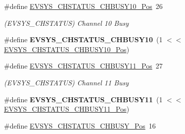 \begin{DoxyCompactItemize}
\item 
\hypertarget{group___s_a_m_l21___e_v_s_y_s_gaef16f98ea1ecf706c13aaab54a8f89ee}{}\#define \hyperlink{group___s_a_m_l21___e_v_s_y_s_gaef16f98ea1ecf706c13aaab54a8f89ee}{E\+V\+S\+Y\+S\+\_\+\+C\+H\+S\+T\+A\+T\+U\+S\+\_\+\+C\+H\+B\+U\+S\+Y10\+\_\+\+Pos}~26\label{group___s_a_m_l21___e_v_s_y_s_gaef16f98ea1ecf706c13aaab54a8f89ee}

\begin{DoxyCompactList}\small\item\em (E\+V\+S\+Y\+S\+\_\+\+C\+H\+S\+T\+A\+T\+U\+S) Channel 10 Busy \end{DoxyCompactList}\item 
\hypertarget{group___s_a_m_l21___e_v_s_y_s_ga1d8c6c70bd3bb364a53e98413c3f4a9a}{}\#define {\bfseries E\+V\+S\+Y\+S\+\_\+\+C\+H\+S\+T\+A\+T\+U\+S\+\_\+\+C\+H\+B\+U\+S\+Y10}~(1 $<$$<$ \hyperlink{group___s_a_m_l21___e_v_s_y_s_gaef16f98ea1ecf706c13aaab54a8f89ee}{E\+V\+S\+Y\+S\+\_\+\+C\+H\+S\+T\+A\+T\+U\+S\+\_\+\+C\+H\+B\+U\+S\+Y10\+\_\+\+Pos})\label{group___s_a_m_l21___e_v_s_y_s_ga1d8c6c70bd3bb364a53e98413c3f4a9a}

\item 
\hypertarget{group___s_a_m_l21___e_v_s_y_s_gac35df61c7dbaba4a51ca27ce046f63a5}{}\#define \hyperlink{group___s_a_m_l21___e_v_s_y_s_gac35df61c7dbaba4a51ca27ce046f63a5}{E\+V\+S\+Y\+S\+\_\+\+C\+H\+S\+T\+A\+T\+U\+S\+\_\+\+C\+H\+B\+U\+S\+Y11\+\_\+\+Pos}~27\label{group___s_a_m_l21___e_v_s_y_s_gac35df61c7dbaba4a51ca27ce046f63a5}

\begin{DoxyCompactList}\small\item\em (E\+V\+S\+Y\+S\+\_\+\+C\+H\+S\+T\+A\+T\+U\+S) Channel 11 Busy \end{DoxyCompactList}\item 
\hypertarget{group___s_a_m_l21___e_v_s_y_s_ga4d141cd748445ac8d2982ab72a2016ce}{}\#define {\bfseries E\+V\+S\+Y\+S\+\_\+\+C\+H\+S\+T\+A\+T\+U\+S\+\_\+\+C\+H\+B\+U\+S\+Y11}~(1 $<$$<$ \hyperlink{group___s_a_m_l21___e_v_s_y_s_gac35df61c7dbaba4a51ca27ce046f63a5}{E\+V\+S\+Y\+S\+\_\+\+C\+H\+S\+T\+A\+T\+U\+S\+\_\+\+C\+H\+B\+U\+S\+Y11\+\_\+\+Pos})\label{group___s_a_m_l21___e_v_s_y_s_ga4d141cd748445ac8d2982ab72a2016ce}

\item 
\hypertarget{group___s_a_m_l21___e_v_s_y_s_gaf934c39253522ee2b09adf3b8a61ab8b}{}\#define \hyperlink{group___s_a_m_l21___e_v_s_y_s_gaf934c39253522ee2b09adf3b8a61ab8b}{E\+V\+S\+Y\+S\+\_\+\+C\+H\+S\+T\+A\+T\+U\+S\+\_\+\+C\+H\+B\+U\+S\+Y\+\_\+\+Pos}~16\label{group___s_a_m_l21___e_v_s_y_s_gaf934c39253522ee2b09adf3b8a61ab8b}


\end{DoxyCompactItemize}
